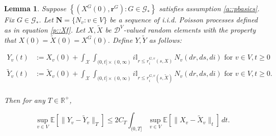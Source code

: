 \documentclass[12pt]{article}
\newcommand{\mb}{\mathbb}
\newcommand{\mc}{\mathcal}
\newcommand{\te}{\text}
\newcommand{\ex}[1]{\mb{E}\left[#1\right]}			%
\newcommand{\defeq}{:=}								%
\newcommand{\cad}{\mc{D}}							%
\newcommand{\sta}{\mc{X}}							%
\newcommand{\Xf}{X}									%
\newcommand{\poiss}{N}								%
\newcommand{\rate}{r}								%
\newcommand{\poisses}{\mathbf{N}}					%
\newcommand{\poissv}[1]{_{#1}}						%
\newcommand{\vind}[1]{_{#1}}						%
\newcommand{\tme}[1]{(#1)}							%
\newcommand{\gind}[1]{^{#1}}						%
\newcommand{\vpara}[1]{^{#1}}						%
\newcommand{\stpara}[1]{_{#1}}						%
\newcommand{\tpara}[1]{_{#1}}						%
\newcommand{\gvpara}[2]{^{#1,#2}}					%
\newcommand{\rateset}{\mathbf{\rate}}				%
\newcommand{\jumpbd}[1]{C_{#1}}						%
\newcommand{\tmepro}[2]{(#1,#2)}					%
\newcommand{\Gs}{\mc{G}_\ast}						%
\newcommand{\Xg}{Y}									%
\newcommand{\alt}[1]{\tilde{#1}}					%
\newtheorem{lem}[thms]{Lemma}
\begin{document}
\begin{lem}
Suppose \(\left\{(\Xf\gind{G}\tme{0},\rateset\gind{G}):G \in \Gs\right\}\) satisfies assumption \ref{a::pbasics}. Fix \(G \in \Gs\). Let \(\poisses = \{\poiss\poissv{v}:v \in V\}\) be a sequence of i.i.d. Poisson processes defined as in equation \eqref{p::Xf}. Let \(\Xf,\alt{\Xf}\) be \(\cad\vpara{V}\)-valued random elements with the property that \(\Xf\tme{0} = \alt{\Xf}\tme{0} = \Xf\gind{G}\tme{0}\). Define \(\Xg,\alt{\Xg}\) as follows:

\begin{align*}
\Xg\vind{v}\tme{t} &\defeq \Xf\vind{v}\tme{0} + \int_\sta\int_{(0,t]\times(0,\infty)} i\mb{I}_{r \leq \rate\gvpara{G}{v}\stpara{i}\tmepro{s}{\Xf}}\,\poiss\poissv{v}(dr,ds,di) \te{ for } v \in V,t \geq 0\\
\alt{\Xg}\vind{v}\tme{t} &\defeq \alt{\Xf}\vind{v}\tme{0} + \int_\sta\int_{(0,t]\times(0,\infty)} i\mb{I}_{r \leq \rate\gvpara{G}{v}\stpara{i}\tmepro{s}{\alt{\Xf}}}\,\poiss\poissv{v}(dr,ds,di) \te{ for } v \in V,t \geq 0.\\
\end{align*}

Then for any \(T \in \mb{R}^+\),

\begin{equation}
\sup_{v\in V}\ex{\|\Xg\vind{v} - \alt{\Xg}\vind{v}\|\tpara{T}} \leq 2\jumpbd{T} \int_{(0,T]} \sup_{v \in V} \ex{\|\Xf\vind{v} - \alt{\Xf}\vind{v}\|\tpara{t}}\,dt.
\label{wp::Groneqn}
\end{equation}
\label{wp::Gronwall}
\end{lem}
\end{document}
